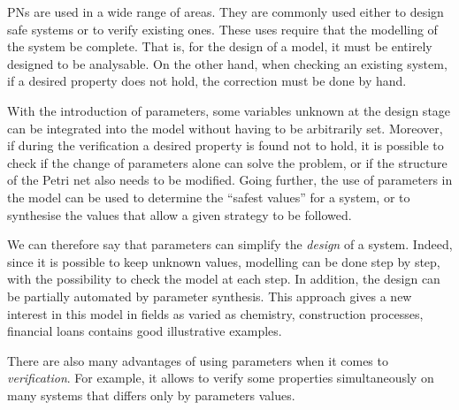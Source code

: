 
\acp{PN} are used in a wide range of areas.
They are commonly used either to design safe systems or to verify existing ones.
These uses require that the modelling of the system be complete.
That is, for the design of a model, it must be entirely designed to be analysable.
On the other hand, when checking an existing system, if a desired property does not hold, the correction must be done by hand.

With the introduction of parameters, some variables unknown at the design stage can be integrated into the model without having to be arbitrarily set.
Moreover, if during the verification a desired property is found not to hold, it is possible to check if the change of parameters alone can solve the problem, or if the structure of the Petri net also needs to be modified.
Going further, the use of parameters in the model can be used to determine the ``safest values'' for a system, or to synthesise the values that allow a given strategy to be followed.

We can therefore say that parameters can simplify the \emph{design} of a system. Indeed, since it is possible to keep unknown values, modelling can be done step by step, with the possibility to check the model at each step.
In addition, the design can be partially automated by parameter synthesis.
This approach gives a new interest in this model in fields as varied as chemistry, construction processes, financial loans\etc
\cite{David17} contains good illustrative examples.

There are also many advantages of using parameters when it comes to \emph{verification}.
For example, it allows to verify some properties simultaneously on many systems that differs only by parameters values.
